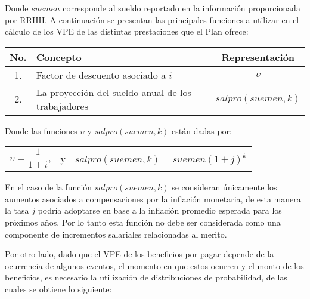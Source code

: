 \documentclass[12pt,letterpaper,titlepage]{article}
\begin{document}
{Donde $suemen$ corresponde al sueldo reportado en la información proporcionada por RRHH. A continuación se presentan las principales funciones a utilizar en el cálculo de los VPE de las distintas prestaciones que el Plan ofrece: \\

\begin{center}
	\begin{tabular}{|c||l||c|} %
		\hline 
		\rule[-1ex]{0pt}{2.5ex} No. & Concepto & Representación \\ 
		\hline 
		\hline 
		\rule[-1ex]{0pt}{2.5ex} 1. & Factor de descuento asociado a $i$ & $\upsilon$ \\ 
		\hline 
		\rule[-1ex]{0pt}{2.5ex} 2. & La proyección del sueldo anual de los trabajadores & $salpro(suemen,k)$ \\ 
		\hline 
	\end{tabular} 
\end{center}

Donde las funciones  $\upsilon$ y $salpro(suemen,k)$ están dadas por:\\

\begin{center}
	\begin{tabular}{ccc}
		$\upsilon = \dfrac{1}{1+i}$, & y & $salpro(suemen,k)=suemen(1+j)^{k}$
	\end{tabular} 
\end{center} 

En el caso de la función $salpro(suemen,k)$ se consideran únicamente los aumentos asociados a compensaciones por la inflación monetaria, de esta manera la tasa $j$ podría adoptarse en base a la inflación promedio esperada para los próximos años. Por lo tanto esta función no debe ser considerada como una componente de incrementos salariales relacionadas al merito.

Por otro lado, dado que el VPE de los beneficios por pagar depende de la ocurrencia de algunos eventos, el momento en que estos ocurren y el monto de los beneficios, es necesario la utilización de distribuciones de probabilidad, de las cuales se obtiene lo siguiente:\\


}
\end{document}
